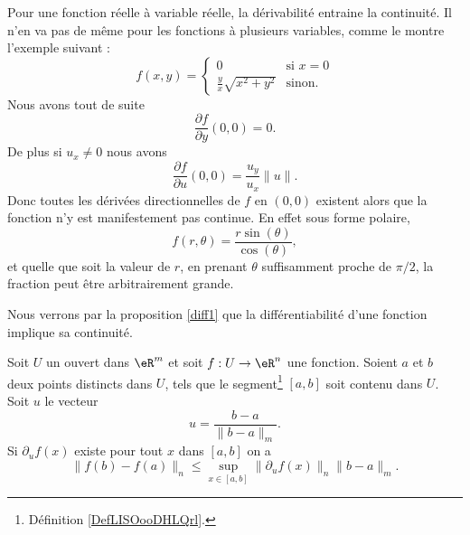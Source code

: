 \begin{example}
    Pour une fonction réelle à variable réelle, la dérivabilité entraine la continuité. Il n'en va pas de même pour les fonctions à plusieurs variables, comme le montre l'exemple suivant :
    \begin{equation}
        f(x,y)=\begin{cases}
            0    &   \text{si } x=0\\
            \frac{ y }{ x }\sqrt{x^2+y^2}    &    \text{sinon.}
        \end{cases}
    \end{equation}
    Nous avons tout de suite
    \begin{equation}
        \frac{ \partial f }{ \partial y }(0,0)=0.
    \end{equation}
    De plus si \( u_x\neq 0\) nous avons
    \begin{equation}
            \frac{ \partial f }{ \partial u }(0,0)=\frac{ u_y }{ u_x }\| u \|.
    \end{equation}
    Donc toutes les dérivées directionnelles de \( f\) en \( (0,0)\) existent alors que la fonction n'y est manifestement pas continue. En effet sous forme polaire,
    \begin{equation}
        f(r,\theta)=\frac{ r\sin(\theta) }{ \cos(\theta) },
    \end{equation}
    et quelle que soit la valeur de \( r\), en prenant \( \theta\) suffisamment proche de \( \pi/2\), la fraction peut être arbitrairement grande.

    Nous verrons par la proposition \ref{diff1} que la différentiabilité d'une fonction implique sa continuité.
\end{example}

\begin{theorem}\label{val_medio_1}		
    Soit $U$ un ouvert dans $\eR^m$ et soit $f:U\to\eR^n$ une fonction. Soient $a$ et $b$ deux points distincts dans $U$, tels que le segment\footnote{Définition \ref{DefLISOooDHLQrl}.} $[a,b]$ soit contenu dans $U$. Soit $u$ le vecteur 
	\[
		u=\frac{b-a}{\|b-a\|_m}.
	\] 
	Si $\partial_u f(x)$ existe pour tout $x$ dans $[a,b]$ on a
	\[
		\|f(b)-f(a)\|_n\leq \sup_{x\in[a,b]}\|\partial_uf(x)\|_n\|b-a\|_m.
	\]
\end{theorem}

